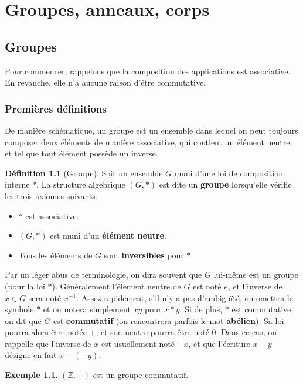 \documentclass[french]{book}
\newcommand{\Z}{\mathbb{Z}}
\newcommand{\inv}{^{-1}}
\theoremstyle{plain}
\theoremstyle{definition}
\newtheorem{dfn}{Définition}[chapter]
\newtheorem{exa}{Exemple}[chapter]
\theoremstyle{remark}
\begin{document}
\newpage
\chapter{Groupes, anneaux, corps}
\section{Groupes}
Pour commencer, rappelons que la composition des applications est associative. En revanche, elle n'a aucune raison d'être commutative.
\subsection{Premières définitions}
De manière schématique, un groupe est un ensemble dans lequel on peut toujours composer deux éléments de manière associative, qui contient un élément neutre, et tel que tout élément possède un inverse.
\begin{dfn}[Groupe]
	Soit un ensemble $G$ muni d'une loi de composition interne $*$. La structure algébrique $(G,*)$ est dite un \textbf{groupe} lorsqu'elle vérifie les trois axiomes suivants.
	\begin{itemize}
		\item $*$ est associative.
		\item $(G,*)$ est muni d'un \textbf{élément neutre}.
		\item Tous les éléments de $G$ sont \textbf{inversibles} pour $*$.
	\end{itemize}
Par un léger abus de terminologie, on dira souvent que $G$ lui-même est un groupe (pour la loi $*$). Généralement l'élément neutre de $G$ est noté $e$, et l'inverse de $x\in G$ sera noté $x\inv$. Assez rapidement, s'il n'y a pas d'ambiguïté, on omettra le symbole $*$ et on notera simplement $xy$ pour $x*y$. Si de plus, $*$ est commutative, on dit que $G$ est \textbf{commutatif} (on rencontrera parfois le mot \textbf{abélien}). Sa loi pourra alors être notée $+$, et son neutre pourra être noté $0$. Dans ce cas, on rappelle que l'inverse de $x$ est usuellement noté $-x$, et que l'écriture $x-y$ désigne en fait $x+(-y)$.
\end{dfn}
\begin{exa}
	$(\Z,+)$ est un groupe commutatif.
\end{exa}
\end{document}
